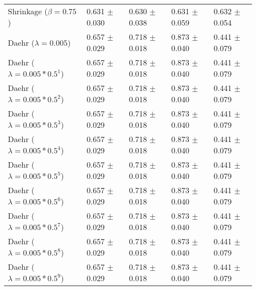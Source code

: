 \begin{table}
\begin{tabular}{*{5}{l}}
Shrinkage ($\beta=0.75$)&0.631 $\pm$ 0.030&0.630 $\pm$ 0.038&0.631 $\pm$ 0.059&0.632 $\pm$ 0.054\\
Daehr ($\lambda=0.005$)&0.657 $\pm$ 0.029&0.718 $\pm$ 0.018&0.873 $\pm$ 0.040&0.441 $\pm$ 0.079\\
Daehr ($\lambda=0.005*0.5^1$)&0.657 $\pm$ 0.029&0.718 $\pm$ 0.018&0.873 $\pm$ 0.040&0.441 $\pm$ 0.079\\
Daehr ($\lambda=0.005*0.5^2$)&0.657 $\pm$ 0.029&0.718 $\pm$ 0.018&0.873 $\pm$ 0.040&0.441 $\pm$ 0.079\\
Daehr ($\lambda=0.005*0.5^3$)&0.657 $\pm$ 0.029&0.718 $\pm$ 0.018&0.873 $\pm$ 0.040&0.441 $\pm$ 0.079\\
Daehr ($\lambda=0.005*0.5^4$)&0.657 $\pm$ 0.029&0.718 $\pm$ 0.018&0.873 $\pm$ 0.040&0.441 $\pm$ 0.079\\
Daehr ($\lambda=0.005*0.5^5$)&0.657 $\pm$ 0.029&0.718 $\pm$ 0.018&0.873 $\pm$ 0.040&0.441 $\pm$ 0.079\\
Daehr ($\lambda=0.005*0.5^6$)&0.657 $\pm$ 0.029&0.718 $\pm$ 0.018&0.873 $\pm$ 0.040&0.441 $\pm$ 0.079\\
Daehr ($\lambda=0.005*0.5^7$)&0.657 $\pm$ 0.029&0.718 $\pm$ 0.018&0.873 $\pm$ 0.040&0.441 $\pm$ 0.079\\
Daehr ($\lambda=0.005*0.5^8$)&0.657 $\pm$ 0.029&0.718 $\pm$ 0.018&0.873 $\pm$ 0.040&0.441 $\pm$ 0.079\\
Daehr ($\lambda=0.005*0.5^9$)&0.657 $\pm$ 0.029&0.718 $\pm$ 0.018&0.873 $\pm$ 0.040&0.441 $\pm$ 0.079\\
\bottomrule
\end{tabular}
\end{table}

